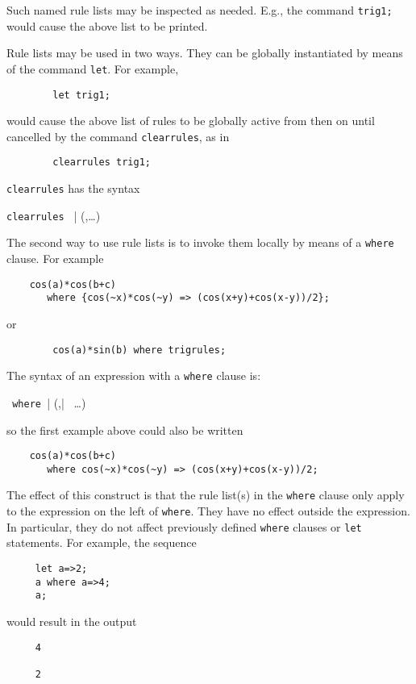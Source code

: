 Such named rule lists may be inspected as needed. E.g., the command
\texttt{trig1;} would cause the above list to be printed.

\hypertarget{CLEARRULES}{}
Rule lists may be used in two ways.  They can be globally instantiated by
means of the command \texttt{let}. For example,
\begin{verbatim}
        let trig1;
\end{verbatim}
would cause the above list of rules to be globally active from then on until
cancelled by the command \texttt{clearrules}, as in
\begin{verbatim}
        clearrules trig1;
\end{verbatim}
\texttt{clearrules} has the syntax
\begin{syntax}
  \texttt{clearrules } | (,\ldots)
\end{syntax}

\hypertarget{operator:WHERE}{}
The second way to use rule lists is to invoke them locally by means of a
\texttt{where} clause.  For example
\begin{verbatim}
    cos(a)*cos(b+c)
       where {cos(~x)*cos(~y) => (cos(x+y)+cos(x-y))/2};
\end{verbatim}
or
\begin{verbatim}
        cos(a)*sin(b) where trigrules;
\end{verbatim}

The syntax of an expression with a \texttt{where} clause is:
\begin{syntax}
  \texttt{ where }| (,| \ \ldots)
\end{syntax}
so the first example above could also be written
\begin{verbatim}
    cos(a)*cos(b+c)
       where cos(~x)*cos(~y) => (cos(x+y)+cos(x-y))/2;
\end{verbatim}

The effect of this construct is that the rule list(s) in the \texttt{where}
clause only apply to the expression on the left of \texttt{where}.  They have
no effect outside the expression.  In particular, they do not affect
previously defined \texttt{where} clauses or \texttt{let} statements.  For
example, the sequence
\begin{verbatim}
     let a=>2;
     a where a=>4;
     a;
\end{verbatim}
would result in the output
\begin{verbatim}
     4

     2
\end{verbatim}

